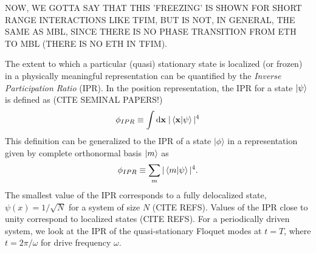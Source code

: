 \documentclass[%
 reprint,
superscriptaddress,
 amsmath,amssymb,
 aps,
prb,
]{revtex4-2}
\begin{document}
NOW, WE GOTTA SAY THAT THIS 'FREEZING' IS SHOWN FOR SHORT RANGE INTERACTIONS LIKE TFIM, BUT IS NOT, IN GENERAL, THE SAME AS MBL, SINCE THERE IS NO PHASE TRANSITION FROM ETH TO MBL (THERE IS NO ETH IN TFIM).

The extent to which a particular (quasi) stationary state is localized (or frozen) in a physically meaningful representation can be quantified by the \emph{Inverse Participation Ratio} (IPR). In the position representation, the IPR for a state $\ket{\psi}$ is defined as (CITE SEMINAL PAPERS!)
\begin{equation*}
	\phi_{IPR}\equiv \int \mathrm{d}\mathbf{x}\;\vert\ip{\mathbf{x}}{\psi}\vert^4
\end{equation*}
This definition can be generalized to the IPR of a state $|\phi\rangle$ in a representation given by complete orthonormal basis $\ket{m}$ as 
\begin{equation}
\label{eq:ipr:defn}
\phi_{IPR} \equiv \sum_m\vert\ip{m}{\psi}\vert^4.
\end{equation}
The smallest value of the IPR corresponds to a fully delocalized state, $\psi(x)=1/\sqrt{N}$ for a system of size $N$ (CITE REFS). Values of the IPR close to unity correspond to localized states (CITE REFS). For a periodically driven system, we look at the IPR of the quasi-stationary Floquet modes at $t=T$, where $t=2\pi/\omega$ for drive frequency $\omega$.
\end{document}
